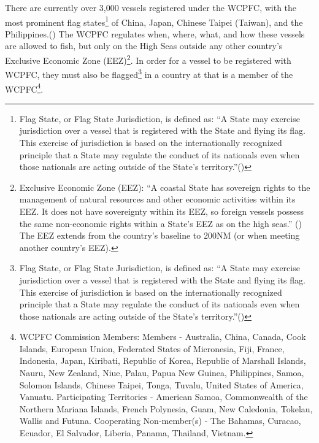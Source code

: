 \documentclass[
  letterpaper,
  DIV=11,
  numbers=noendperiod]{scrartcl}
\begin{document}
There are currently over 3,000 vessels registered under the WCPFC, with
the most prominent flag states\footnote{Flag State, or Flag State
  Jurisdiction, is defined as: ``A State may exercise jurisdiction over
  a vessel that is registered with the State and flying its flag. This
  exercise of jurisdiction is based on the internationally recognized
  principle that a State may regulate the conduct of its nationals even
  when those nationals are acting outside of the State's
  territory.''()} of China, Japan, Chinese Taipei
(Taiwan), and the Philippines.() The WCPFC regulates when, where, what, and how these vessels are
allowed to fish, but only on the High Seas outside any other country's
Exclusive Economic Zone (EEZ)\footnote{Exclusive Economic Zone (EEZ):
  ``A coastal State has sovereign rights to the management of natural
  resources and other economic activities within its EEZ. It does not
  have sovereignty within its EEZ, so foreign vessels possess the same
  non-economic rights within a State's EEZ as on the high seas.''
  () The EEZ extends from the country's
  baseline to 200NM (or when meeting another country's EEZ).}. In order
for a vessel to be registered with WCPFC, they must also be
flagged\footnote{Flag State, or Flag State Jurisdiction, is defined as:
  ``A State may exercise jurisdiction over a vessel that is registered
  with the State and flying its flag. This exercise of jurisdiction is
  based on the internationally recognized principle that a State may
  regulate the conduct of its nationals even when those nationals are
  acting outside of the State's
  territory.''()} in a country at that is a
member of the WCPFC\footnote{WCPFC Commission Members: Members -
  Australia, China, Canada, Cook Islands, European Union, Federated
  States of Micronesia, Fiji, France, Indonesia, Japan, Kiribati,
  Republic of Korea, Republic of Marshall Islands, Nauru, New Zealand,
  Niue, Palau, Papua New Guinea, Philippines, Samoa, Solomon Islands,
  Chinese Taipei, Tonga, Tuvalu, United States of America, Vanuatu.
  Participating Territories - American Samoa, Commonwealth of the
  Northern Mariana Islands, French Polynesia, Guam, New Caledonia,
  Tokelau, Wallis and Futuna. Cooperating Non-member(s) - The Bahamas,
  Curacao, Ecuador, El Salvador, Liberia, Panama, Thailand, Vietnam.}.
\end{document}
